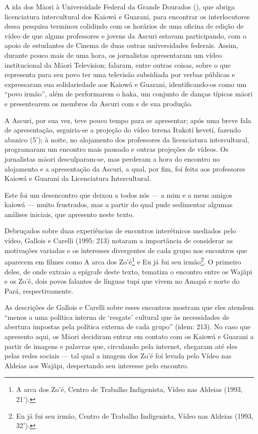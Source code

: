 A ida dos M\=aori à Universidade Federal da Grande Dourados (), que
abriga licenciatura intercultural dos Kaiowá e Guarani, para encontrar
os interlocutores dessa pesquisa terminou colidindo com os horários de
uma oficina de edição de vídeo de que alguns professores e jovens da
Ascuri estavam participando, com o apoio de estudantes de Cinema de
duas outras universidades federais. Assim, durante pouco mais de uma
hora, os jornalistas apresentaram um vídeo institucional da M\=aori
Television; falaram, entre outras coisas, sobre o que representa para
seu povo ter uma televisão subsidiada por verbas públicas e expressaram
sua solidariedade aos Kaiowá e Guarani, identificando-os como um ``povo
irmão'', além de performarem o haka, um conjunto de danças típicas
m\=aori e presentearem os membros da Ascuri com s de sua produção. 

A Ascuri, por sua vez, teve pouco tempo para se apresentar; após uma
breve fala de apresentação, seguiria-se a projeção do vídeo terena
Itukotí kevetí, fazendo abanico (5’); à noite, no alojamento dos
professores da licenciatura intercultural, programaram um encontro mais
pausado e outras projeções de vídeos. Os jornalistas m\=aori
desculparam-se, mas perderam a hora do encontro no alojamento e a
apresentação da Ascuri, a qual, por fim, foi feita aos professores
Kaiowá e Guarani da Licenciatura Intercultural. 

Este foi um desencontro que deixou a todos nós --- a mim e a meus amigos
kaiowá --- muito frustrados, mas a partir do qual pude sedimentar algumas
análises iniciais, que apresento neste texto. 

Debruçados sobre duas experiências de encontros interétnicos mediados
pelo vídeo, Gallois e Carelli (1995: 213) notaram a importância de
considerar as motivações variadas e os interesses divergentes de cada
grupo nos encontros que aparecem em filmes como A arca dos
Zo’é\footnote{A arca dos Zo’é, Centro de Trabalho Indigenista, Vídeo
nas Aldeias (1993, 21’).} e Eu já fui seu irmão\footnote{Eu já fui seu
irmão, Centro de Trabalho Indigenista, Vídeo nas Aldeias (1993, 32’).}.
O primeiro deles, de onde extraio a epígrafe deste texto, tematiza o
encontro entre os Wajãpi e os Zo’é, dois povos falantes de línguas tupi
que vivem no Amapá e norte do Pará, respectivamente.

As descrições de Gallois e Carelli sobre esses encontros mostram que
eles atendem ``menos a uma política interna de ‘resgate’ cultural que às
necessidades de abertura impostas pela política externa de cada grupo''
(idem: 213). No caso que apresento aqui, os M\=aori decidiram entrar em
contato com os Kaiowá e Guarani a partir de imagens e palavras que,
circulando pela internet, chegaram até eles pelas redes sociais --- tal
qual a imagem dos Zo’é foi levada pelo Vídeo nas Aldeias aos Wajãpi,
despertando seu interesse pelo encontro.

